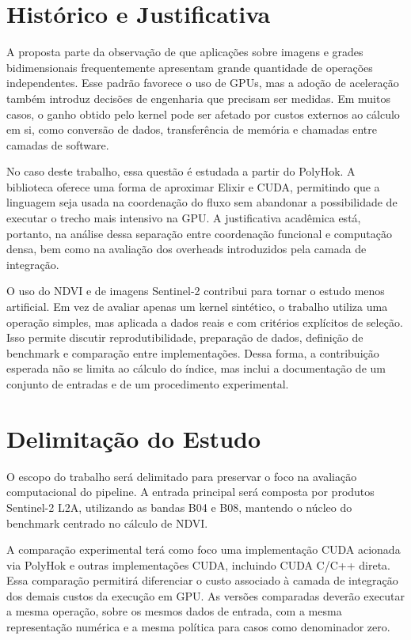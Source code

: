 \documentclass[tcc,capa]{texufpel}
\begin{document}
\section{Histórico e Justificativa}

A proposta parte da observação de que aplicações sobre imagens e grades
bidimensionais frequentemente apresentam grande quantidade de operações
independentes. Esse padrão favorece o uso de GPUs, mas a adoção de aceleração
também introduz decisões de engenharia que precisam ser medidas. Em muitos casos,
o ganho obtido pelo kernel pode ser afetado por custos externos ao cálculo em si,
como conversão de dados, transferência de memória e chamadas entre camadas de
software.

No caso deste trabalho, essa questão é estudada a partir do PolyHok. A biblioteca
oferece uma forma de aproximar Elixir e CUDA, permitindo que a linguagem seja usada
na coordenação do fluxo sem abandonar a possibilidade de executar o trecho mais
intensivo na GPU. A justificativa acadêmica está, portanto, na análise dessa
separação entre coordenação funcional e computação densa, bem como na avaliação
dos overheads introduzidos pela camada de integração.

O uso do NDVI e de imagens Sentinel-2 contribui para tornar o estudo menos
artificial. Em vez de avaliar apenas um kernel sintético, o trabalho utiliza uma
operação simples, mas aplicada a dados reais e com critérios explícitos de seleção.
Isso permite discutir reprodutibilidade, preparação de dados, definição de benchmark
e comparação entre implementações. Dessa forma, a contribuição esperada não se
limita ao cálculo do índice, mas inclui a documentação de um conjunto de entradas e
de um procedimento experimental.

\section{Delimitação do Estudo}

O escopo do trabalho será delimitado para preservar o foco na avaliação
computacional do pipeline. A entrada principal será composta por produtos
Sentinel-2 L2A, utilizando as bandas B04 e B08, mantendo o núcleo do benchmark
centrado no cálculo de NDVI.

A comparação experimental terá como foco uma implementação CUDA acionada via
PolyHok e outras implementações CUDA, incluindo CUDA C/C++ direta. Essa comparação
permitirá diferenciar o custo associado à camada de integração dos demais custos da
execução em GPU. As versões comparadas deverão executar a mesma operação, sobre os
mesmos dados de entrada, com a mesma representação numérica e a mesma política para
casos como denominador zero.
\end{document}
